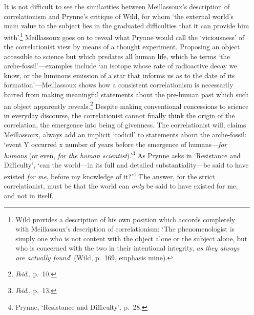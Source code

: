 \documentclass[]{article}
\begin{document}
It is not difficult to see the similarities between Meillassoux's
description of correlationism and Prynne's critique of Wild, for whom
`the external world's main value to the subject lies in the graduated
difficulties that it can provide him with'.\footnote{Wild provides a
  description of his own position which accords completely with
  Meillassoux's description of correlationism: `The phenomenologist is
  simply one who is not content with the object alone or the subject
  alone, but who is concerned with the two in their intentional
  integrity, \emph{as they always are actually found}' (Wild, p.~169,
  emphasis mine).} Meillassoux goes on to reveal what Prynne would call
the `viciousness' of the correlationist view by means of a thought
experiment. Proposing an object accessible to science but which predates
all human life, which he terms `the arche-fossil'---examples include `an
isotope whose rate of radioactive decay we know, or the luminous
emission of a star that informs us as to the date of its
formation'---Meillassoux shows how a consistent correlationism is
necessarily barred from making meaningful statements about the pre-human
past which such an object apparently reveals.\footnote{\emph{Ibid}.,
  p.~10.} Despite making conventional concessions to science in everyday
discourse, the correlationist cannot finally think the origin of the
correlation, the emergence into being of givenness. The correlationist
will, claims Meillassoux, always add an implicit `codicil' to statements
about the arche-fossil: `event Y occurred x number of years before the
emergence of humans---\emph{for humans} (or even, \emph{for the human
scientist}).'\footnote{\emph{Ibid}., p.~13.} As Prynne asks in
`Resistance and Difficulty', `can the world---in its full and detailed
substantiality---be said to have existed \emph{for me}, before my
knowledge of it?'\footnote{Prynne, `Resistance and Difficulty', p.~28.}
The answer, for the strict correlationist, must be that the world can
\emph{only} be said to have existed for me, and not in itself.
\end{document}
